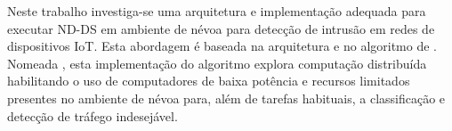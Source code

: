 



Neste trabalho investiga-se uma arquitetura e implementação adequada para
executar \acf{ND-DS} em ambiente de névoa para detecção de intrusão em redes de
dispositivos \acf{IoT}.
Esta abordagem é baseada na arquitetura \arch \cite{Cassales2019a} e no algoritmo
de \nd \minas \cite{Faria2016minas}.
Nomeada \mfog, esta implementação do algoritmo explora computação distribuída
habilitando o uso de computadores de baixa potência e recursos limitados presentes no
ambiente de névoa para, além de tarefas habituais, a classificação e detecção de
tráfego indesejável.

